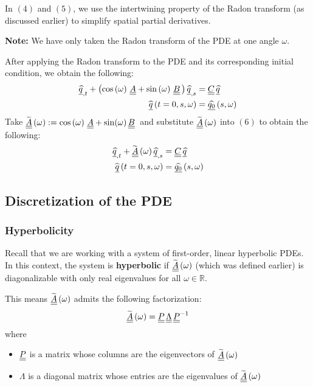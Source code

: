 In $(4)$ and $(5)$, we use the intertwining property of the Radon transform (as discussed earlier) to simplify spatial partial derivatives.
\par
\textbf{Note:} We have only taken the Radon transform of the PDE at one angle $\omega$.
\par
After applying the Radon transform to the PDE and its corresponding initial condition, we obtain the following:
\begin{align}
    {\underline{\widehat{q}}}_{,t} + \left( \cos \left( \omega \right) \, {\underline{\underline{A}}} + \sin \left( \omega \right) \, {\underline{\underline{B}}} \, \right) {\underline{\widehat{q}}}_{,s} & = {\underline{\underline{C}}}\,{\underline{\widehat{q}}} \\
    \widehat{{\underline{q}}} \left( t = 0, s, \omega \right) & = \widehat{{\underline{q_0}}} \left( s, \omega \right)
\end{align}
Take $\widetilde{{\underline{\underline{A}}}} \left( \omega \right) :=  \cos \left( \omega \right) \, {\underline{\underline{A}}} + \sin (\omega) \, {\underline{\underline{B}}}\,$ and substitute $\widetilde{{\underline{\underline{A}}}} \left( \omega \right)$ into $\left( 6 \right)$ to obtain the following:
\begin{align}
	{\underline{\widehat{q}}}_{,t} + \widetilde{{\underline{\underline{A}}}} \left( \omega \right) {\underline{\widehat{q}}}_{,s} & = {\underline{\underline{C}}}\,{\underline{\widehat{q}}} \\
	\widehat{{\underline{q}}} \left( t = 0, s, \omega \right) & = \widehat{{\underline{q_0}}} \left( s, \omega \right)
\end{align}

\subsection{Discretization of the PDE}

\subsubsection{Hyperbolicity}

Recall that we are working with a system of first-order, linear hyperbolic PDEs.
In this context, the system is \textbf{hyperbolic} if $\widetilde{{\underline{\underline{A}}}} \left( \omega \right)$ (which was defined earlier) is diagonalizable with only real eigenvalues for all $\omega \in \mathbb{R}$.
\par 
This means $\widetilde{{\underline{\underline{A}}}} \left( \omega \right)$ admits the following factorization:
\begin{align}
    \widetilde{{\underline{\underline{A}}}} \left( \omega \right) = {\underline{\underline{P}}} \, {\underline{\underline{\Lambda}}} \, {\underline{\underline{P}}}^{-1}
\end{align}
where
\begin{itemize}
    \item ${\underline{\underline{P}}}$ is a matrix whose columns are the eigenvectors of $\widetilde{{\underline{\underline{A}}}} \left( \omega \right)$
    \item $\Lambda$ is a diagonal matrix whose entries are the eigenvalues of $\widetilde{{\underline{\underline{A}}}} \left( \omega \right)$
\end{itemize}

